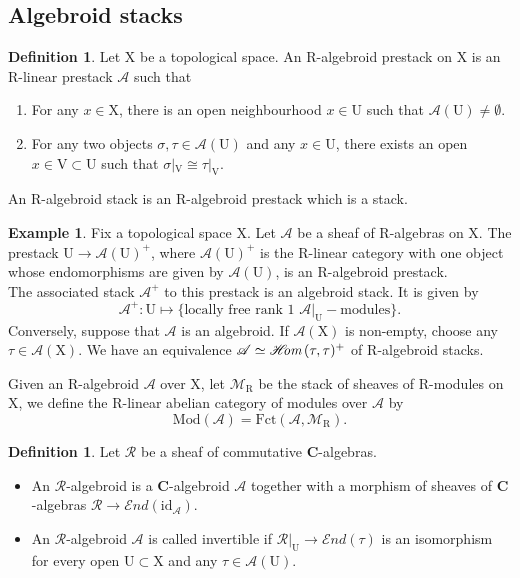 \documentclass{article}
\theoremstyle{plain}
\theoremstyle{definition}
\newtheorem{definition}[theorem]{Definition}
\newtheorem{example}[theorem]{Example}
\theoremstyle{remark}
\newcommand{\mr}{\mathrm}
\newcommand{\C}{\mathbf C}
\newcommand{\3}{\vspace{3mm}}
\newcommand{\2}{\vspace{2mm}}
\newcommand{\1}{\vspace{1mm}}
\newcommand*{\shom}{\mathscr{H}\text{\kern -3pt {\it{om}}}\,}
\begin{document}
 \subsection{Algebroid stacks}
 \begin{definition}
 Let $\mr{X}$ be a topological space. An $\mr{R}$-algebroid prestack on $\mr{X}$ is an $\mr{R}$-linear prestack $\mathscr{A}$ such that 
 \begin{enumerate}
 \item For any $x\in \mr{X}$, there is an open neighbourhood $x\in \mr{U}$ such that $\mathscr{A}(\mr{U})\not=\emptyset$.
 \item For any two objects $\sigma,\tau \in \mathscr{A}(\mr{U})$ and any $x\in \mr{U}$, there exists an open $x \in \mr{V}\subset \mr{U}$ such that $\sigma|_\mr{V}\cong \tau|_\mr{V}$.
\end{enumerate}
An $\mr{R}$-algebroid stack is an $\mr{R}$-algebroid prestack which is a stack.
\end{definition}
\2
\begin{example}Fix a topological space $\mr{X}$.
 Let $\mathscr{A}$ be a sheaf of $\mr{R}$-algebras on $\mr{X}$. The prestack $\mr{U} \to \mathscr{A}(\mr{U})^{+}$, where $\mathscr{A}(\mr{U})^{+}$ is the $\mr{R}$-linear category with one object whose endomorphisms are given by $\mathscr{A}(\mr{U})$, is an $\mr{R}$-algebroid prestack. \\
The associated stack $\mathscr{A}^{+}$ to this prestack is an algebroid stack. It is given by $$\mathscr{A}^{+}:\mr{U}\mapsto \{\text{locally free rank 1 } \mathscr{A}|_\mr{U}-\text{modules}\}.$$
Conversely, suppose that $\mathscr{A}$ is an algebroid. If $\mathscr{A}(\mr{X})$ is non-empty, choose any $\tau \in \mathscr{A}(\mr{X})$. We have an equivalence $\mathscr{A} \simeq \shom(\tau,\tau)^{+}$ of $\mr{R}$-algebroid stacks.
\end{example}
Given an $\mr{R}$-algebroid $\mathscr{A}$ over $\mr{X}$, let $\mathscr{M}_\mr{R}$ be the stack of sheaves of $\mr{R}$-modules on $\mr X$, we define the $\mr{R}$-linear abelian category of modules over $\mathscr{A}$ by $$\mr{Mod}(\mathscr{A}) = \mr{Fct}(\mathscr{A},\mathscr{M}_\mr{R}).$$
\2
\begin{definition}Let $\mathscr{R}$ be a sheaf of commutative $\C$-algebras.
\begin{itemize}
 \item An $\mathscr{R}$-algebroid is a $\C$-algebroid $\mathscr{A}$ together with a morphism of sheaves of $\C$-algebras $\mathscr{R} \to \mathscr{E}nd(\mr{id}_{\mathscr{A}})$.
 \item An $\mathscr{R}$-algebroid $\mathscr{A}$ is called invertible if $\mathscr{R}|_\mr{U} \to \mathscr{E}nd(\tau)$ is an isomorphism for every open $\mr{U}\subset \mr{X}$ and any $\tau \in \mathscr{A}(\mr U)$.
 \end{itemize}
\end{definition}
\end{document}
